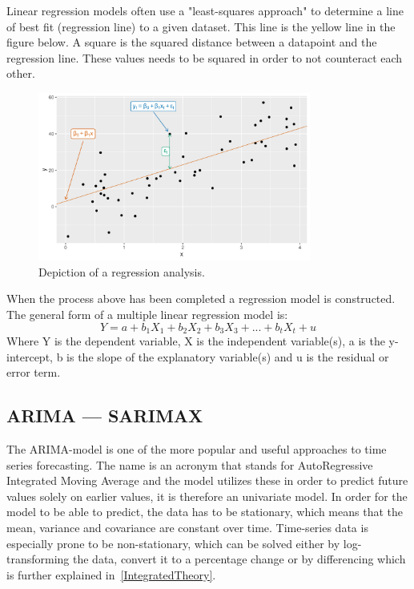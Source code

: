 Linear regression models often use a "least-squares approach" to determine a line of best fit (regression line) to a given dataset. This line is the yellow line in the figure below. A square is the squared distance between a datapoint and the regression line. These values needs to be squared in order to not counteract each other.   

\begin{figure}[H]
    \centering
    \includegraphics[width=0.8\textwidth]{data/Figures/Regression/regression_linear.png}
    \caption[Depiction of a regression analysis]{Depiction of a regression analysis.~\cite{hyndman_athanasopoulos_2021}}\label{fig:Regression}
\end{figure}

When the process above has been completed a regression model is constructed. The general form of a multiple linear regression model is:  
\begin{equation}
    Y = a + b_1X_1 + b_2X_2 + b_3X_3 + ... + b_tX_t + u
\end{equation}
Where Y is the dependent variable, X is the independent variable(s), a is the y-intercept, b is the slope of the explanatory variable(s) and u is the residual or error term.

\subsection{ARIMA --- SARIMAX}\label{ARIMATheory}

The ARIMA-model is one of the more popular and useful approaches to time series forecasting. The name is an acronym that stands for AutoRegressive Integrated Moving Average and the model utilizes these in order to predict future values solely on earlier values, it is therefore an univariate model. In order for the model to be able to predict, the data has to be stationary, which means that the mean, variance and covariance are constant over time. Time-series data is especially prone to be non-stationary, which can be solved either by log-transforming the data, convert it to a percentage change or by differencing which is further explained in~\ref{IntegratedTheory}.

